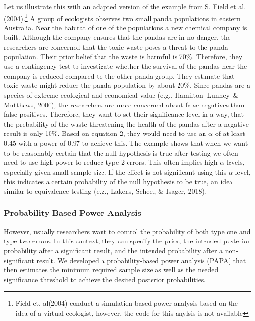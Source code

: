 \documentclass[
  english,
  ,jou,floatsintext]{apa6}
\begin{document}
Let us illustrate this with an adapted version of the example from S. Field et al. (2004).\footnote{Field et. al(2004) conduct a simulation-based power analysis based on the idea of a virtual ecologist, however, the code for this anylsis is not available} A group of ecologists observes two small panda populations in eastern Australia. Near the habitat of one of the populations a new chemical company is built. Although the company ensures that the pandas are in no danger, the researchers are concerned that the toxic waste poses a threat to the panda population. Their prior belief that the waste is harmful is 70\%. Therefore, they use a contingency test to investigate whether the survival of the pandas near the company is reduced compared to the other panda group. They estimate that toxic waste might reduce the panda population by about 20\%. Since pandas are a species of extreme ecological and economical value (e.g., Hamilton, Lunney, \& Matthews, 2000), the researchers are more concerned about false negatives than false positives. Therefore, they want to set their significance level in a way, that the probability of the waste threatening the health of the pandas after a negative result is only 10\%.
Based on equation 2, they would need to use an \(\alpha\) of at least 0.45 with a power of 0.97 to achieve this.
The example shows that when we want to be reasonably certain that the null hypothesis is true after testing we often need to use high power to reduce type 2 errors. This often implies high \(\alpha\) levels, especially given small sample size. If the effect is not significant using this \(\alpha\) level, this indicates a certain probability of the null hypothesis to be true, an idea similar to equivalence testing (e.g., Lakens, Scheel, \& Isager, 2018).

\hypertarget{probability-based-power-analysis}{%
\subsubsection{Probability-Based Power Analysis}\label{probability-based-power-analysis}}

However, usually researchers want to control the probability of both type one and type two errors. In this context, they can specify the prior, the intended posterior probability after a significant result, and the intended probability after a non-significant result. We developed a probability-based power analysis (PAPA) that then estimates the minimum required sample size as well as the needed significance threshold to achieve the desired posterior probabilities.
\end{document}
